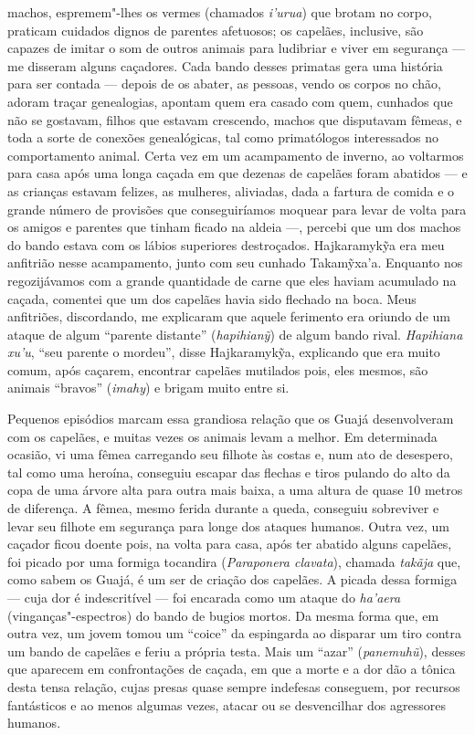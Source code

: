machos, espremem"-lhes os vermes (chamados \emph{i'urua}) que brotam no
corpo, praticam cuidados dignos de parentes afetuosos; os capelães,
inclusive, são capazes de imitar o som de outros animais para ludibriar
e viver em segurança --- me disseram alguns caçadores. Cada bando desses
primatas gera uma história para ser contada --- depois de os abater, as
pessoas, vendo os corpos no chão, adoram traçar genealogias, apontam
quem era casado com quem, cunhados que não se gostavam, filhos que
estavam crescendo, machos que disputavam fêmeas, e toda a sorte de
conexões genealógicas, tal como primatólogos interessados no
comportamento animal. Certa vez em um acampamento de inverno, ao
voltarmos para casa após uma longa caçada em que dezenas de capelães
foram abatidos --- e as crianças estavam felizes, as mulheres, aliviadas,
dada a fartura de comida e o grande número de provisões que
conseguiríamos moquear para levar de volta para os amigos e parentes que
tinham ficado na aldeia ---, percebi que um dos machos do bando estava com
os lábios superiores destroçados. Hajkaramykỹa era meu anfitrião nesse
acampamento, junto com seu cunhado Takamỹxa'a. Enquanto nos
regozijávamos com a grande quantidade de carne que eles haviam acumulado
na caçada, comentei que um dos capelães havia sido flechado na boca.
Meus anfitriões, discordando, me explicaram que aquele ferimento era
oriundo de um ataque de algum ``parente distante'' (\emph{hapihianỹ}) de
algum bando rival. \emph{Hapihiana xu'u}, ``seu parente o mordeu'',
disse Hajkaramykỹa, explicando que era muito comum, após caçarem,
encontrar capelães mutilados pois, eles mesmos, são animais ``bravos''
(\emph{imahy}) e brigam muito entre si.

Pequenos episódios marcam essa grandiosa relação que os Guajá
desenvolveram com os capelães, e muitas vezes os animais levam a melhor.
Em determinada ocasião, vi uma fêmea carregando seu filhote às costas e,
num ato de desespero, tal como uma heroína, conseguiu escapar das
flechas e tiros pulando do alto da copa de uma árvore alta para outra
mais baixa, a uma altura de quase 10 metros de diferença. A fêmea, mesmo
ferida durante a queda, conseguiu sobreviver e levar seu filhote em
segurança para longe dos ataques humanos. Outra vez, um caçador ficou
doente pois, na volta para casa, após ter abatido alguns capelães, foi
picado por uma formiga tocandira (\emph{Paraponera clavata}), chamada
\emph{takãja} que, como sabem os Guajá, é um ser de criação dos
capelães. A picada dessa formiga --- cuja dor é indescritível --- foi
encarada como um ataque do \emph{ha'aera} (vinganças"-espectros) do bando
de bugios mortos. Da mesma forma que, em outra vez, um jovem tomou um
``coice'' da espingarda ao disparar um tiro contra um bando de capelães
e feriu a própria testa. Mais um ``azar'' (\emph{panemuhũ}), desses que
aparecem em confrontações de caçada, em que a morte e a dor dão a tônica
desta tensa relação, cujas presas quase sempre indefesas conseguem, por
recursos fantásticos e ao menos algumas vezes, atacar ou se desvencilhar
dos agressores humanos.

